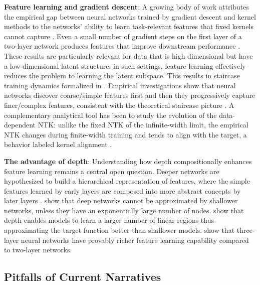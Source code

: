 \documentclass{article}
\theoremstyle{plain}
\theoremstyle{definition}
\theoremstyle{remark}
\newcommand{\1}{{\mathbf 1}}
\newcommand{\0}{{\mathbf 0}}
\renewcommand{\>}{{\rightarrow}}
\begin{document}
\textbf{Feature learning and gradient descent}: A growing body of work attributes the empirical gap between neural networks trained by gradient descent and kernel methods to the networks’ ability to learn task-relevant features that fixed kernels cannot capture \cite{Zhu+19, Daniely+20, Li+20, Yehudai+19}. Even a small number of gradient steps on the first layer of a two-layer network produces features that improve downstream performance \cite{Daniely+20, Damian+22} . These results are particularly relevant for data that is high dimensional but have a low-dimensional latent structure: in such settings, feature learning effectively reduces the problem to learning the latent subspace. This results in staircase training dynamics formalized in \cite{Abbe+21, Abbe+22b, Abbe+23}. Empirical investigations show that neural networks discover coarse/simple features first and then they progressively capture finer/complex features, consistent with the theoretical staircase picture \cite{Kalimeris+19}. A complementary analytical tool has been to study the evolution of the data-dependent NTK: unlike the fixed NTK of the infinite-width limit, the empirical NTK changes during finite-width training and tends to align with the target, a behavior labeled kernel alignment \cite{Fort+20, Loo+22, Atanasov+22, Wang+23}.

\textbf{The advantage of depth}: Understanding how depth compositionally enhances feature learning remains a central open question. Deeper networks are hypothesized to build a hierarchical representation of features, where the simple features learned by early layers are composed into more abstract concepts by later layers \cite{Allen-Zhu+20}. \cite{Telgarsky+16} show that deep networks cannot be approximated by shallower networks, unless they have an exponentially large number of nodes. \cite{Montufar+14} show that depth enables models to learn a larger number of linear regions thus approximating the target function better than shallower models. \cite{Nichani+23} show that three-layer neural networks have provably richer feature learning capability compared to two-layer networks.

\subsection{Pitfalls of Current Narratives}
\end{document}
